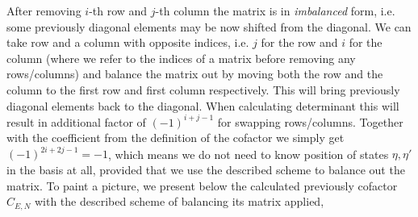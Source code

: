 \documentclass{article}
\begin{document}
After removing $i$-th row and $j$-th column the matrix is in \textit{imbalanced} form, i.e. some previously diagonal elements may be now shifted from the diagonal. We can take row and a column with opposite indices, i.e. $j$ for the row and $i$ for the column (where we refer to the indices of a matrix before removing any rows/columns) and balance the matrix out by moving both the row and the column to the first row and first column respectively. This will bring previously diagonal elements back to the diagonal. When calculating determinant this will result in additional factor of $(-1)^{i+j-1}$ for swapping rows/columns. Together with the coefficient from the definition of the cofactor we simply get $(-1)^{2i+2j-1} = -1$, which means we do not need to know position of states $\eta, \eta'$ in the basis at all, provided that we use the described scheme to balance out the matrix. To paint a picture, we present below the calculated previously cofactor $C_{E,N}$ with the described scheme of balancing its matrix applied,
\end{document}
